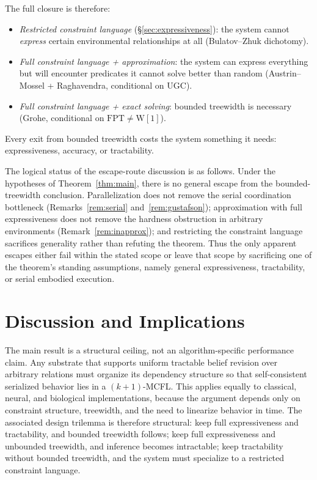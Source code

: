 \documentclass[runningheads]{llncs}
\begin{document}
\begin{remark}
The full closure is therefore:
\begin{itemize}[nosep]
  \item \emph{Restricted constraint language} (\S\ref{sec:expressiveness}): the system cannot \emph{express} certain environmental relationships at all (Bulatov--Zhuk dichotomy).
  \item \emph{Full constraint language + approximation}: the system can express everything but will encounter predicates it cannot solve better than random (Austrin--Mossel + Raghavendra, conditional on UGC).
  \item \emph{Full constraint language + exact solving}: bounded treewidth is necessary (Grohe, conditional on $\mathrm{FPT} \neq \mathrm{W}[1]$).
\end{itemize}
Every exit from bounded treewidth costs the system something it needs: expressiveness, accuracy, or tractability.
\end{remark}

\begin{remark}\label{rem:no-escape}
The logical status of the escape-route discussion is as follows.
Under the hypotheses of Theorem~\ref{thm:main}, there is no general escape from the bounded-treewidth conclusion.
Parallelization does not remove the serial coordination bottleneck (Remarks~\ref{rem:serial} and~\ref{rem:gustafson}); approximation with full expressiveness does not remove the hardness obstruction in arbitrary environments (Remark~\ref{rem:inapprox}); and restricting the constraint language sacrifices generality rather than refuting the theorem.
Thus the only apparent escapes either fail within the stated scope or leave that scope by sacrificing one of the theorem's standing assumptions, namely general expressiveness, tractability, or serial embodied execution.
\end{remark}

\section{Discussion and Implications}\label{sec:discussion}

The main result is a structural ceiling, not an algorithm-specific performance claim. Any substrate that supports uniform tractable belief revision over arbitrary relations must organize its dependency structure so that self-consistent serialized behavior lies in a $(k{+}1)$-MCFL. This applies equally to classical, neural, and biological implementations, because the argument depends only on constraint structure, treewidth, and the need to linearize behavior in time. The associated design trilemma is therefore structural: keep full expressiveness and tractability, and bounded treewidth follows; keep full expressiveness and unbounded treewidth, and inference becomes intractable; keep tractability without bounded treewidth, and the system must specialize to a restricted constraint language.
\end{document}

